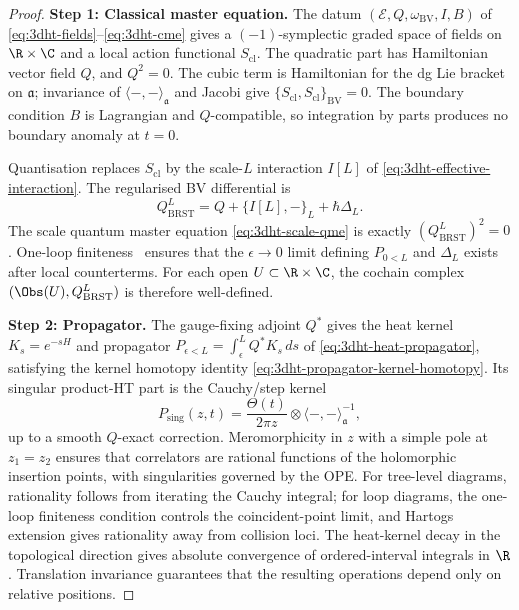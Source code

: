 \begin{proof}

\medskip\noindent\textbf{Step 1: Classical master equation.}
The datum \((\mathcal E,Q,\omega_{\mathrm{BV}},I,B)\) of
\eqref{eq:3dht-fields}--\eqref{eq:3dht-cme} gives a
\((-1)\)-symplectic graded space of fields on \(\R\times\C\) and a
local action functional \(S_{\mathrm{cl}}\). The quadratic part has
Hamiltonian vector field \(Q\), and \(Q^2=0\). The cubic term is
Hamiltonian for the dg Lie bracket on \(\mathfrak a\); invariance of
\(\langle-,-\rangle_{\mathfrak a}\) and Jacobi give
\(\{S_{\mathrm{cl}},S_{\mathrm{cl}}\}_{\mathrm{BV}}=0\). The boundary
condition \(B\) is Lagrangian and \(Q\)-compatible, so integration by
parts produces no boundary anomaly at \(t=0\).

Quantisation replaces \(S_{\mathrm{cl}}\) by the scale-\(L\)
interaction \(I[L]\) of \eqref{eq:3dht-effective-interaction}. The
regularised BV differential is
\[
 Q_{\mathrm{BRST}}^L
 =
 Q+\{I[L],-\}_L+\hbar\Delta_L .
\]
The scale quantum master equation \eqref{eq:3dht-scale-qme} is exactly
\((Q_{\mathrm{BRST}}^L)^2=0\). One-loop finiteness~\cite{GRW21}
ensures that the \(\epsilon\to0\) limit defining \(P_{0<L}\) and
\(\Delta_L\) exists after local counterterms. For each open
\(U\subset\R\times\C\), the cochain complex
\((\Obs(U),Q_{\mathrm{BRST}}^L)\) is therefore well-defined.

\medskip\noindent\textbf{Step 2: Propagator.}
The gauge-fixing adjoint \(Q^*\) gives the heat kernel \(K_s=e^{-sH}\)
and propagator \(P_{\epsilon<L}=\int_\epsilon^L Q^*K_s\,ds\) of
\eqref{eq:3dht-heat-propagator}, satisfying the kernel homotopy identity
\eqref{eq:3dht-propagator-kernel-homotopy}. Its singular product-HT
part is the Cauchy/step kernel
\[
 P_{\mathrm{sing}}(z,t)=\frac{\Theta(t)}{2\pi z}
 \otimes\langle-,-\rangle_{\mathfrak a}^{-1},
\]
up to a smooth \(Q\)-exact correction. Meromorphicity in \(z\) with a
simple pole at \(z_1=z_2\) ensures that correlators are rational
functions of the holomorphic insertion points, with singularities
governed by the OPE. For tree-level diagrams, rationality follows from
iterating the Cauchy integral; for loop diagrams, the one-loop
finiteness condition controls the coincident-point limit, and Hartogs
extension gives rationality away from collision loci. The heat-kernel
decay in the topological direction gives absolute convergence of
ordered-interval integrals in \(\R\). Translation invariance guarantees
that the resulting operations depend only on relative positions.


\end{proof}
